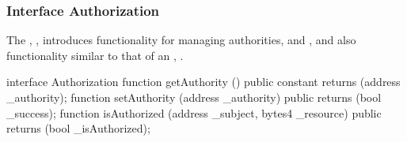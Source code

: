 \subsubsection{Interface Authorization}

The , , introduces functionality
for managing authorities,  and , and also functionality similar to that of an ,
.%


\begin{solidity}
interface Authorization {
  function getAuthority () public constant returns (address _authority);
  function setAuthority (address _authority) public returns (bool _success);
  function isAuthorized (address _subject, bytes4 _resource) public returns (bool _isAuthorized);
}
\end{solidity}

